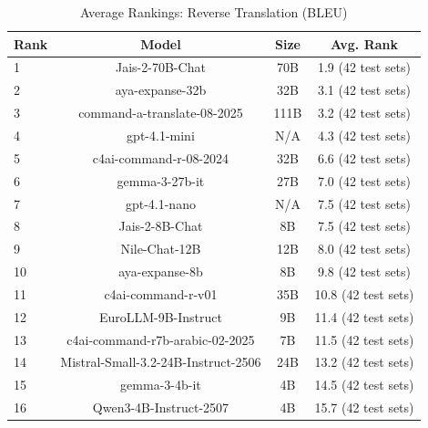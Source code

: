 \begin{table}[htbp]
\centering
\caption{Average Rankings: Reverse Translation (BLEU)}
\label{tab:avg_rankings_bleu}
\begin{tabular}{l@{\hspace{3pt}}c@{\hspace{3pt}}c@{\hspace{3pt}}c}
\toprule
Rank & Model & Size & Avg. Rank \\
\midrule
1 & Jais-2-70B-Chat & 70B & 1.9 (42 test sets) \\
2 & aya-expanse-32b & 32B & 3.1 (42 test sets) \\
3 & command-a-translate-08-2025 & 111B & 3.2 (42 test sets) \\
4 & gpt-4.1-mini & N/A & 4.3 (42 test sets) \\
5 & c4ai-command-r-08-2024 & 32B & 6.6 (42 test sets) \\
6 & gemma-3-27b-it & 27B & 7.0 (42 test sets) \\
7 & gpt-4.1-nano & N/A & 7.5 (42 test sets) \\
8 & Jais-2-8B-Chat & 8B & 7.5 (42 test sets) \\
9 & Nile-Chat-12B & 12B & 8.0 (42 test sets) \\
10 & aya-expanse-8b & 8B & 9.8 (42 test sets) \\
11 & c4ai-command-r-v01 & 35B & 10.8 (42 test sets) \\
12 & EuroLLM-9B-Instruct & 9B & 11.4 (42 test sets) \\
13 & c4ai-command-r7b-arabic-02-2025 & 7B & 11.5 (42 test sets) \\
14 & Mistral-Small-3.2-24B-Instruct-2506 & 24B & 13.2 (42 test sets) \\
15 & gemma-3-4b-it & 4B & 14.5 (42 test sets) \\
16 & Qwen3-4B-Instruct-2507 & 4B & 15.7 (42 test sets) \\
\bottomrule
\end{tabular}
\end{table}